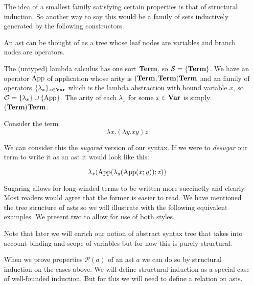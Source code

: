 \begin{remark}
    The idea of a smallest family satisfying certain properties is that of structural induction. So another way to say this would be a family of sets inductively generated by the following constructors.
\end{remark}

\begin{remark}
    An ast can be thought of as a tree whose leaf nodes are variables and branch nodes are operators. 
\end{remark}

\begin{example}
    The (untyped) lambda calculus has one sort $\mathbf{Term}$, so $\mathcal{S} = \{ \mathbf{Term} \} $. We have an operator $\text{App}$ of application whose arity is $(\mathbf{Term}, \mathbf{Term})\mathbf{Term}$ and an family of operators $\{\lambda_x \}_{x \in \mathbf{Var}}$ which is the lambda abstraction with bound variable $x$, so $\mathcal{O} = \{ \lambda_x \} \cup \{ \text{App} \} $. The arity of each $\lambda_x$ for some $x \in \mathbf{Var}$ is simply $(\mathbf{Term}) \mathbf{Term}$.
    
    Consider the term $$\lambda x . (\lambda y . x y)  z$$

    We can consider this the \textit{sugared} version of our syntax. If we were to \textit{desugar} our term to write it as an ast it would look like this:

    $$
        \lambda_x(\text{App}(\lambda_y(\text{App}(x ; y)); z) )
    $$

    Sugaring allows for long-winded terms to be written more succinctly and clearly. Most readers would agree that the former is easier to read. We have mentioned the tree structure of asts so we will illustrate with the following equivalent examples. We present two to allow for use of both styles.
    
    
    
\end{example}

\begin{remark}
    Note that later we will enrich our notion of abstract syntax tree that takes into account binding and scope of variables but for now this is purely structural.
\end{remark}

\begin{remark}
    When we prove properties $\mathcal{P}(a)$ of an ast $a$ we can do so by structural induction on the cases above. We will define structural induction as a special case of well-founded induction. But for this we will need to define a relation on asts.
\end{remark}

